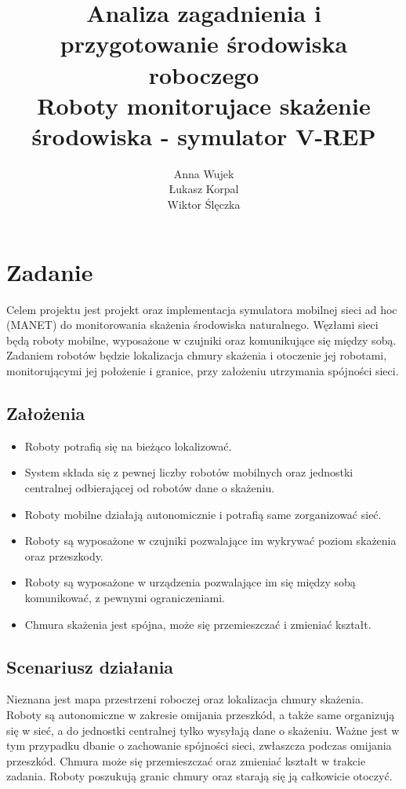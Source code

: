 \documentclass[a4paper, 12pt]{article}
\author{Anna Wujek \\ Łukasz Korpal \\ Wiktor Ślęczka}
\title{Analiza zagadnienia i przygotowanie środowiska roboczego \\ {\large Roboty monitorujace skażenie środowiska - symulator V-REP}}
\begin{document}
	\sloppy
	\maketitle
	\section{Zadanie}
	Celem projektu jest projekt oraz implementacja symulatora mobilnej sieci ad hoc (MANET) do monitorowania skażenia środowiska naturalnego. Węzłami sieci będą roboty mobilne, wyposażone w czujniki oraz komunikujące się między sobą. Zadaniem robotów będzie lokalizacja chmury skażenia i otoczenie jej robotami, monitorującymi jej położenie i granice, przy założeniu utrzymania spójności sieci.
	
	\subsection{Założenia}
	\begin{itemize}
		\item Roboty potrafią się na bieżąco lokalizować.
		\item System składa się z pewnej liczby robotów mobilnych oraz jednostki centralnej odbierającej od robotów dane o skażeniu.
		\item Roboty mobilne działają autonomicznie i potrafią same zorganizować sieć.
		\item Roboty są wyposażone w czujniki pozwalające im wykrywać poziom skażenia oraz przeszkody.
		\item Roboty są wyposażone w urządzenia pozwalające im się między sobą komunikować, z pewnymi ograniczeniami.
		\item Chmura skażenia jest spójna, może się przemieszczać i zmieniać kształt.
	\end{itemize}
	
	\subsection{Scenariusz działania}
		
		Nieznana jest mapa przestrzeni roboczej oraz lokalizacja chmury skażenia. Roboty są autonomiczne w zakresie omijania przeszkód, a także same organizują się w sieć, a do jednostki centralnej tylko wysyłają dane o skażeniu. Ważne jest w tym przypadku dbanie o zachowanie spójności sieci, zwłaszcza podczas omijania przeszkód. Chmura może się przemieszczać oraz zmieniać kształt w trakcie zadania. Roboty poszukują granic chmury oraz starają się ją całkowicie otoczyć.
		
\end{document}
